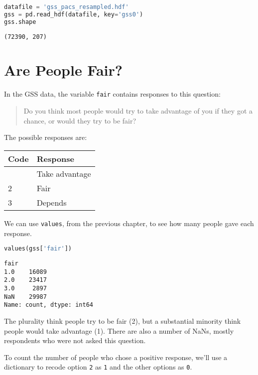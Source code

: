 \begin{lstlisting}[language=Python,style=source]
datafile = 'gss_pacs_resampled.hdf'
gss = pd.read_hdf(datafile, key='gss0')
gss.shape
\end{lstlisting}

\begin{lstlisting}[style=output]
(72390, 207)
\end{lstlisting}

\section{Are People Fair?}\label{are-people-fair}

In the GSS data, the variable \passthrough{\lstinline!fair!} contains
responses to this question:

\begin{quote}
Do you think most people would try to take advantage of you if they got
a chance, or would they try to be fair?
\end{quote}

The possible responses are:

\begin{longtable}[]{ll}
\toprule
Code & Response \\
\midrule
\endhead
\bottomrule
\endlastfoot
1 & Take advantage \\
2 & Fair \\
3 & Depends \\
\end{longtable}

We can use \passthrough{\lstinline!values!}, from the previous chapter,
to see how many people gave each response.

\begin{lstlisting}[language=Python,style=source]
values(gss['fair'])
\end{lstlisting}

\begin{lstlisting}[style=output]
fair
1.0    16089
2.0    23417
3.0     2897
NaN    29987
Name: count, dtype: int64
\end{lstlisting}

The plurality think people try to be fair (2), but a substantial
minority think people would take advantage (1). There are also a number
of NaNs, mostly respondents who were not asked this question.

\pagebreak

To count the number of people who chose a positive response, we'll use a
dictionary to recode option \passthrough{\lstinline!2!} as
\passthrough{\lstinline!1!} and the other options as
\passthrough{\lstinline!0!}.

